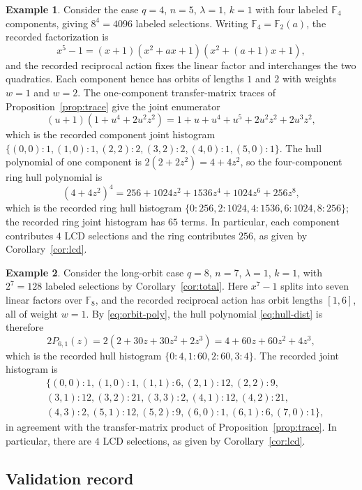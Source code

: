 \documentclass[11pt]{article}
\newcommand{\F}{\mathbb F}
\theoremstyle{plain}
\theoremstyle{definition}
\newtheorem{example}{Example}
\theoremstyle{remark}
\begin{document}
\begin{example}\label{ex:pilot}
Consider the case $q=4$, $n=5$, $\lambda=1$, $k=1$ with four labeled $\F_4$ components, giving $8^4=4096$ labeled selections. Writing $\F_4=\F_2(a)$, the recorded factorization is
\[
x^5-1=(x+1)(x^2+ax+1)(x^2+(a+1)x+1),
\]
and the recorded reciprocal action fixes the linear factor and interchanges the two quadratics. Each component hence has orbits of lengths $1$ and $2$ with weights $w=1$ and $w=2$. The one-component transfer-matrix traces of Proposition~\ref{prop:trace} give the joint enumerator
\[
(u+1)(1+u^4+2u^2z^2)=1+u+u^4+u^5+2u^2z^2+2u^3z^2,
\]
which is the recorded component joint histogram $\{(0,0):1,(1,0):1,(2,2):2,(3,2):2,(4,0):1,(5,0):1\}$. The hull polynomial of one component is $2(2+2z^2)=4+4z^2$, so the four-component ring hull polynomial is
\[
(4+4z^2)^4=256+1024z^2+1536z^4+1024z^6+256z^8,
\]
which is the recorded ring hull histogram $\{0:256,2:1024,4:1536,6:1024,8:256\}$; the recorded ring joint histogram has $65$ terms. In particular, each component contributes $4$ LCD selections and the ring contributes $256$, as given by Corollary~\ref{cor:lcd}.
\end{example}

\begin{example}\label{ex:long-orbit}
Consider the long-orbit case $q=8$, $n=7$, $\lambda=1$, $k=1$, with $2^7=128$ labeled selections by Corollary~\ref{cor:total}. Here $x^7-1$ splits into seven linear factors over $\F_8$, and the recorded reciprocal action has orbit lengths $[1,6]$, all of weight $w=1$. By \eqref{eq:orbit-poly}, the hull polynomial \eqref{eq:hull-dist} is therefore
\[
2P_{6,1}(z)=2(2+30z+30z^2+2z^3)=4+60z+60z^2+4z^3,
\]
which is the recorded hull histogram $\{0:4,1:60,2:60,3:4\}$. The recorded joint histogram is
\[
\begin{aligned}
&\{(0,0):1,(1,0):1,(1,1):6,(2,1):12,(2,2):9,\\
&(3,1):12,(3,2):21,(3,3):2,(4,1):12,(4,2):21,\\
&(4,3):2,(5,1):12,(5,2):9,(6,0):1,(6,1):6,(7,0):1\},
\end{aligned}
\]
in agreement with the transfer-matrix product of Proposition~\ref{prop:trace}. In particular, there are $4$ LCD selections, as given by Corollary~\ref{cor:lcd}.
\end{example}

\subsection{Validation record}
\end{document}
